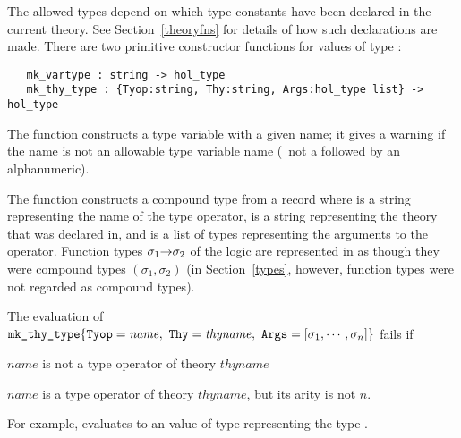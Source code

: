 The allowed types
%
%
depend on which type constants
%
%
have been declared in the current theory. See Section~\ref{theoryfns}
for details of how such declarations are made. There are two primitive
constructor
%
%
functions for values of type :
%
\begin{boxed}
\begin{verbatim}
   mk_vartype : string -> hol_type
   mk_thy_type : {Tyop:string, Thy:string, Args:hol_type list} -> hol_type
\end{verbatim}
\end{boxed}
%
The function  constructs a type variable
%
%
with a given name; it gives a warning if the name is not an allowable
type variable name (\ie\ not a  followed by an alphanumeric).

The function  constructs a compound type
%
%
from a record  where 
is a string representing the name of the type operator,
 is a string representing the theory that
 was declared in, and  is  a list of
types representing the arguments to the operator.  Function types
$\sigma_1{\to}\sigma_2$ of the logic are represented in \ML{} as though
they were compound types $(\sigma_1,\sigma_2)$ (in
Section~\ref{types}, however, function types were not regarded as
compound types).

The evaluation of
$\ml{mk\_thy\_type}\{\ml{Tyop} = \mathit{name},\
\ml{Thy} = \mathit{thyname},\
\ml{Args} = [\sigma_1, \cdots ,\sigma_n]\}$
fails if
%
\begin{myenumerate}
\item $\mathit{name}$ is not a type operator of theory $\mathit{thyname}$
\item $\mathit{name}$ is a type operator of theory $\mathit{thyname}$,
but its arity is not $n$.
\end{myenumerate}
%
For example, 
evaluates to an \ML{} value of type \ml{term} representing the type
\ty{bool}.
%

